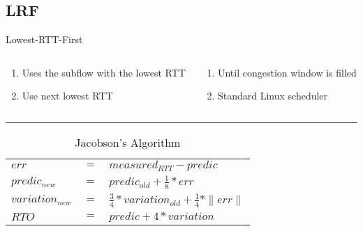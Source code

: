 \documentclass{beamer}
\begin{document}
\subsection{LRF}
\begin{frame}{Lowest-RTT-First}
  \begin{columns}
    \begin{column}{0.48\textwidth}
      \begin{enumerate}
        \setlength\itemsep{1.2em}
        \item Uses the subflow with the lowest RTT
        \setcounter{enumi}{2}
        \item Use next lowest RTT
      \end{enumerate}
    \end{column}

    \begin{column}{0.48\textwidth}
      \begin{enumerate}
        \setlength\itemsep{1.2em}
        \setcounter{enumi}{1}
        \item Until congestion window is filled
        \setcounter{enumi}{3}
        \item Standard Linux scheduler
      \end{enumerate}
    \end{column}
  \end{columns}

  \vspace{0.8cm}
  {\color{uos-red-full}\rule{\textwidth}{1.5pt}}

  \begin{table}[]
    \begin{tabular}{@{}lll@{}}
      \(err\)             & \(=\)& \(measured_{RTT} - predic\)                                \\
      \(predic_{new}\)    & \(=\)& \(predic_{old} + \frac{1}{8} * err\)                       \\
      \(variation_{new}\) & \(=\)& \(\frac{3}{4} * variation_{old} + \frac{1}{4} * \|err\|\)  \\
      \(RTO\)             & \(=\)& \(predic + 4 * variation\)
    \end{tabular}
    \caption{\small Jacobson’s Algorithm}
  \end{table}
\end{frame}

\end{document}
